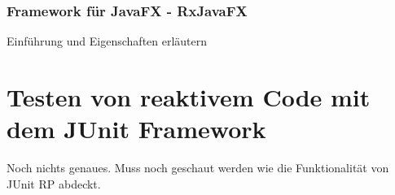 \subsubsection{Framework für JavaFX - RxJavaFX}
Einführung und Eigenschaften erläutern
\section{Testen von reaktivem Code mit dem JUnit Framework}
Noch nichts genaues. Muss noch geschaut werden wie die Funktionalität von JUnit RP abdeckt.